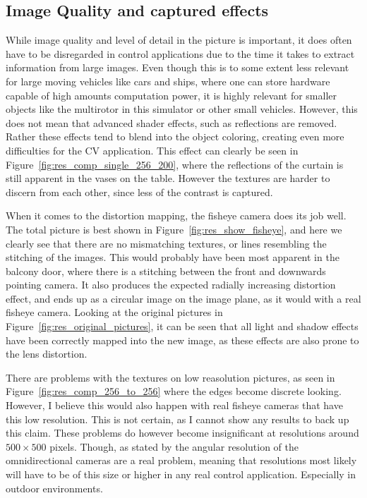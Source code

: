 \subsection{Image Quality and captured effects}

While image quality and level of detail in the picture is important, it does often have to be disregarded in control applications due to the time it takes to extract information from large images. Even though this is to some extent less relevant for large moving vehicles like cars and ships, where one can store hardware capable of high amounts computation power, it is highly relevant for smaller objects like the multirotor in this simulator or other small vehicles. However, this does not mean that advanced shader effects, such as reflections are removed. Rather these effects tend to blend into the object coloring, creating even more difficulties for the CV application. This effect can clearly be seen in Figure~\ref{fig:res_comp_single_256_200}, where the reflections of the curtain is still apparent in the vases on the table. However the textures are harder to discern from each other, since less of the contrast is captured.

When it comes to the distortion mapping, the fisheye camera does its job well. The total picture is best shown in Figure~\ref{fig:res_show_fisheye}, and here we clearly see that there are no mismatching textures, or lines resembling the stitching of the images. This would probably have been most apparent in the balcony door, where there is a stitching between the front and downwards pointing camera. It also produces the expected radially increasing distortion effect, and ends up as a circular image on the image plane, as it would with a real fisheye camera. Looking at the original pictures in Figure~\ref{fig:res_original_pictures}, it can be seen that all light and shadow effects have been correctly mapped into the new image, as these effects are also prone to the lens distortion. 

There are problems with the textures on low reasolution pictures, as seen in Figure~\ref{fig:res_comp_256_to_256} where the edges become discrete looking. However, I believe this would also happen with real fisheye cameras that have this low resolution. This is not certain, as I cannot show any results to back up this claim. These problems do however become insignificant at resolutions around $500\times 500$ pixels. Though, as stated by \cite{Zhang2016BenefitOL} the angular resolution of the omnidirectional cameras are a real problem, meaning that resolutions most likely will have to be of this size or higher in any real control application. Especially in outdoor environments.

